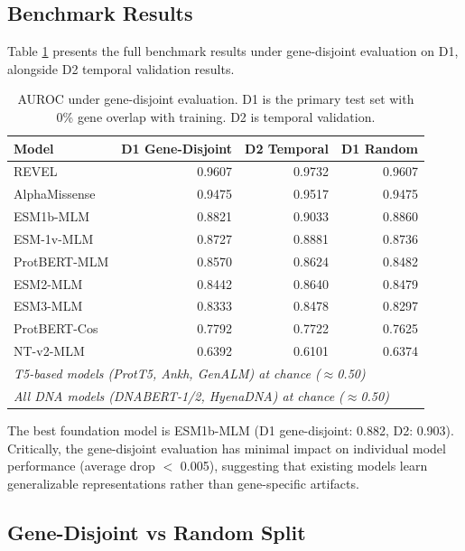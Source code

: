 \documentclass{article}
\begin{document}
\subsection{Benchmark Results}

Table \ref{tab:benchmark} presents the full benchmark results under gene-disjoint evaluation on D1, alongside D2 temporal validation results.

\begin{table}[h]
\centering
\caption{AUROC under gene-disjoint evaluation. D1 is the primary test set with 0\% gene overlap with training. D2 is temporal validation.}
\label{tab:benchmark}
\small
\begin{tabular}{lrrr}
\toprule
\textbf{Model} & \textbf{D1 Gene-Disjoint} & \textbf{D2 Temporal} & \textbf{D1 Random} \\
\midrule
REVEL & 0.9607 & 0.9732 & 0.9607 \\
AlphaMissense & 0.9475 & 0.9517 & 0.9475 \\
\midrule
ESM1b-MLM & 0.8821 & 0.9033 & 0.8860 \\
ESM-1v-MLM & 0.8727 & 0.8881 & 0.8736 \\
ProtBERT-MLM & 0.8570 & 0.8624 & 0.8482 \\
ESM2-MLM & 0.8442 & 0.8640 & 0.8479 \\
ESM3-MLM & 0.8333 & 0.8478 & 0.8297 \\
ProtBERT-Cos & 0.7792 & 0.7722 & 0.7625 \\
NT-v2-MLM & 0.6392 & 0.6101 & 0.6374 \\
\midrule
\multicolumn{4}{l}{\textit{T5-based models (ProtT5, Ankh, GenALM) at chance ($\approx$0.50)}} \\
\multicolumn{4}{l}{\textit{All DNA models (DNABERT-1/2, HyenaDNA) at chance ($\approx$0.50)}} \\
\bottomrule
\end{tabular}
\end{table}

The best foundation model is ESM1b-MLM (D1 gene-disjoint: 0.882, D2: 0.903). Critically, the gene-disjoint evaluation has minimal impact on individual model performance (average drop $<$ 0.005), suggesting that existing models learn generalizable representations rather than gene-specific artifacts.

\subsection{Gene-Disjoint vs Random Split}
\end{document}
